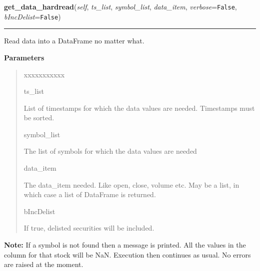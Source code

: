 \hspace{.8\funcindent}\begin{boxedminipage}{\funcwidth}

    \raggedright \textbf{get\_data\_hardread}(\textit{self}, \textit{ts\_list}, \textit{symbol\_list}, \textit{data\_item}, \textit{verbose}={\tt False}, \textit{bIncDelist}={\tt False})

    \vspace{-1.5ex}

    \rule{\textwidth}{0.5\fboxrule}
\setlength{\parskip}{2ex}
    Read data into a DataFrame no matter what.

\setlength{\parskip}{1ex}
      \textbf{Parameters}
      \vspace{-1ex}

      \begin{quote}
        \begin{Ventry}{xxxxxxxxxxx}

          \item[ts\_list]

          List of timestamps for which the data values are needed. 
          Timestamps must be sorted.

          \item[symbol\_list]

          The list of symbols for which the data values are needed

          \item[data\_item]

          The data\_item needed. Like open, close, volume etc.  May be a 
          list, in which case a list of DataFrame is returned.

          \item[bIncDelist]

          If true, delisted securities will be included.

        \end{Ventry}

      \end{quote}

\textbf{Note:} If a symbol is not found then a message is printed. All the values in the 
column for that stock will be NaN. Execution then continues as usual. No 
errors are raised at the moment.



    \end{boxedminipage}

    \label{QSTK:qstkutil:DataAccess:DataAccess:get_data}

